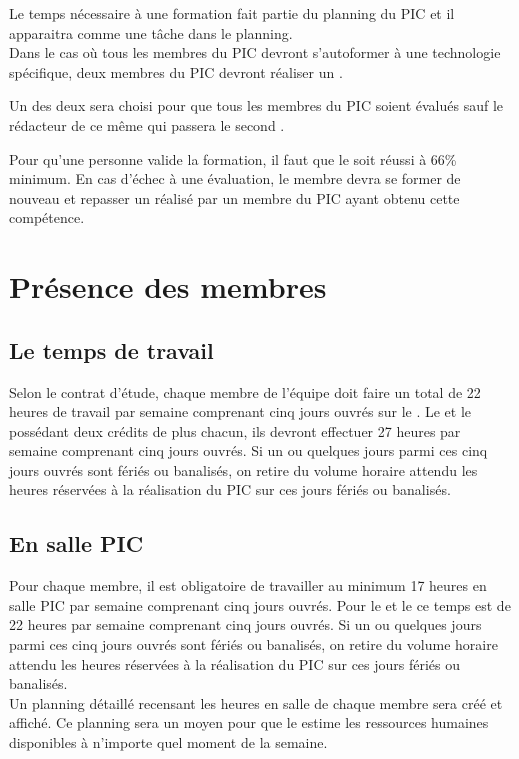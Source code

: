 Le temps nécessaire à une formation fait partie du planning du PIC et il apparaitra comme une tâche dans le planning. \\

Dans le cas où tous les membres du PIC devront s'autoformer à une technologie spécifique, deux membres du PIC devront réaliser un \QCM.

Un des deux \QCMCourt{} sera choisi pour que tous les membres du PIC soient évalués sauf le rédacteur de ce même \QCMCourt{} qui passera le second \QCMCourt.

Pour qu'une personne valide la formation, il faut que le \QCMCourt{} soit réussi à 66\% minimum. En cas d'échec à une évaluation, le membre devra se former de nouveau et repasser un \QCMCourt{} réalisé par un membre du PIC ayant obtenu cette compétence.

\section{Présence des membres}
\label{Présence des membres}

\subsection{Le temps de travail}
\label{temps_de_travail}
Selon le contrat d'étude, chaque membre de l'équipe doit faire un total de 22 heures de travail par semaine comprenant cinq jours ouvrés sur le \PICCourt. Le \CP{} et le \RQ{} possédant deux crédits de plus chacun, ils devront effectuer 27 heures par semaine comprenant cinq jours ouvrés. Si un ou quelques jours parmi ces cinq jours ouvrés sont fériés ou banalisés, on retire du volume horaire attendu les heures réservées à la réalisation du PIC sur ces jours fériés ou banalisés.

\subsection{En salle PIC}
\label{en_salle_pic}
Pour chaque membre, il est obligatoire de travailler au minimum 17 heures en salle PIC par semaine comprenant cinq jours ouvrés. Pour le \CP{} et le \RQ{} ce temps est de 22 heures par semaine comprenant cinq jours ouvrés. Si un ou quelques jours parmi ces cinq jours ouvrés sont fériés ou banalisés, on retire du volume horaire attendu les heures réservées à la réalisation du PIC sur ces jours fériés ou banalisés.\\

Un planning détaillé recensant les heures en salle de chaque membre sera créé et affiché.
Ce planning sera un moyen pour que le \CP{} estime les ressources humaines disponibles à n'importe quel moment de la semaine.

